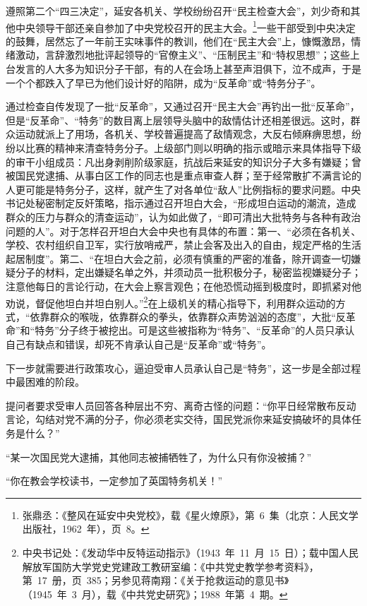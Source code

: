 遵照第二个“四三决定”，延安各机关、学校纷纷召开“民主检查大会”，刘少奇和其他中央领导干部还亲自参加了中央党校召开的民主大会。\footnote{张鼎丞：《整风在延安中央党校》，载《星火燎原》，第~6~集（北京：人民文学出版社，1962~年），页~8。}一些干部受到中央决定的鼓舞，居然忘了一年前王实味事件的教训，他们在“民主大会”上，慷慨激昂，情绪激动，言辞激烈地批评起领导的“官僚主义”、“压制民主”和“特权思想”；这些上台发言的人大多为知识分子干部，有的人在会场上甚至声泪俱下，泣不成声，于是一个个都跌入了早已为他们设计好的陷阱，成为“反革命”或“特务分子”。

通过检查自传发现了一批“反革命”，又通过召开“民主大会”再钓出一批“反革命”，但是“反革命”、“特务”的数目离上层领导头脑中的敌情估计还相差很远。这时，群众运动就派上了用场，各机关、学校普遍提高了敌情观念，大反右倾麻痹思想，纷纷以比赛的精神来清查特务分子。上级部门则以明确的指示或暗示来具体指导下级的审干小组成员：凡出身剥削阶级家庭，抗战后来延安的知识分子大多有嫌疑；曾被国民党逮捕、从事白区工作的同志也是重点审查人群；至于经常散扩不满言论的人更可能是特务分子，这样，就产生了对各单位“敌人”比例指标的要求问题。中央书记处秘密制定反奸策略，指示通过召开坦白大会，“形成坦白运动的潮流，造成群众的压力与群众的清查运动”，认为如此做了，“即可清出大批特务与各种有政治问题的人”。对于怎样召开坦白大会中央也有具体的布置：第一、“必须在各机关、学校、农村组织自卫军，实行放哨戒严，禁止会客及出入的自由，规定严格的生活起居制度”。第二、“在坦白大会之前，必须有慎重的严密的准备，除开调查一切嫌疑分子的材料，定出嫌疑名单之外，并须动员一批积极分子，秘密监视嫌疑分子；注意他每日的言论行动，在大会上察言观色；在他恐慌动摇到极度时，即抓紧对他劝说，督促他坦白并坦白别人。”\footnote{中央书记处：《发动华中反特运动指示》（1943~年~11~月~15~日）；载中国人民解放军国防大学党史党建政工教研室编：《中共党史教学参考资料》，第~17~册，页~385；另参见蒋南翔：《关于抢救运动的意见书》（1945~年~3~月），载《中共党史研究》；1988~年第~4~期。}在上级机关的精心指导下，利用群众运动的方式，“依靠群众的喉咙，依靠群众的拳头，依靠群众声势汹汹的态度”，大批“反革命”和“特务”分子终于被挖出。可是这些被指称为“特务”、“反革命”的人员只承认自己有缺点和错误，却死不肯承认自己是“反革命”或“特务”。

下一步就需要进行政策攻心，逼迫受审人员承认自己是“特务”，这一步是全部过程中最困难的阶段。

提问者要求受审人员回答各种层出不穷、离奇古怪的问题：“你平日经常散布反动言论，勾结对党不满的分子，你必须老实交待，国民党派你来延安搞破坏的具体任务是什么？”

“某一次国民党大逮捕，其他同志被捕牺牲了，为什么只有你没被捕？”

“你在教会学校读书，一定参加了英国特务机关！”

